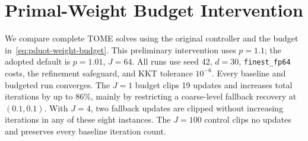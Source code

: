 \section{Primal-Weight Budget Intervention}
\label{app:pduot-weight-budget-experiment}

We compare complete TOME solves using the original controller and the budget in~\eqref{eq:pduot-weight-budget}.
This preliminary intervention uses $p=1.1$; the adopted default is $p=1.01$, $J=64$.
All runs use seed 42, $d=30$, \texttt{finest\_fp64} costs, the refinement safeguard, and KKT tolerance $10^{-6}$.
Every baseline and budgeted run converges.
The $J=1$ budget clips 19 updates and increases total iterations by up to $86\%$, mainly by restricting a coarse-level fallback recovery at $(0.1,0.1)$.
With $J=4$, two fallback updates are clipped without increasing iterations in any of these eight instances.
The $J=100$ control clips no updates and preserves every baseline iteration count.

